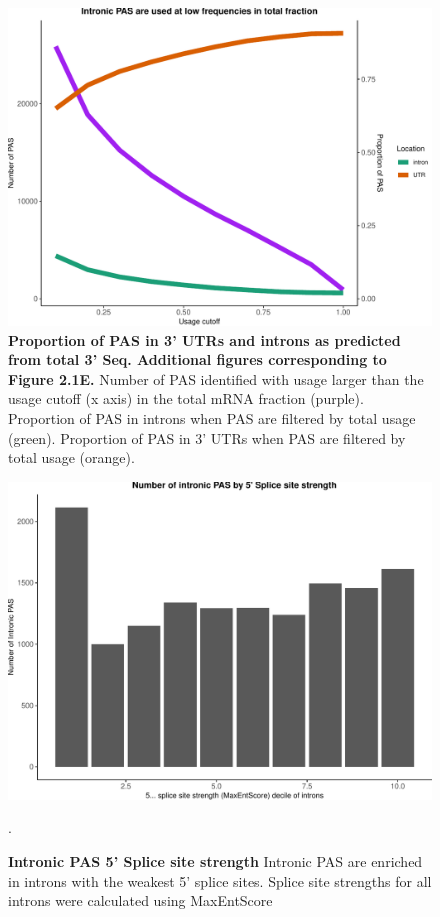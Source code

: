 \begin{figure}[!htb]
\centering
\includegraphics[width=5in]{img/ch02/Fig1_figuresupplement3.pdf}
\caption[Proportion of PAS in 3' UTRs and introns as predicted from total 3' Seq. Additional figures corresponding to Figure 2.1E.]{\textbf{Proportion of PAS in 3' UTRs and introns as predicted from total 3' Seq. Additional figures corresponding to Figure 2.1E.} Number of PAS identified with usage larger than the usage cutoff (x axis) in the total mRNA fraction (purple). Proportion of PAS in introns when PAS are filtered by total usage (green). Proportion of PAS in 3' UTRs when PAS are filtered by total usage (orange).}
\label{fig:totaUsage}
\end{figure}
\clearpage

\begin{figure}[!htb]
\centering \includegraphics[width=5in]{img/ch02/Fig1_figuresupplement4.pdf}
\caption[Intronic PAS 5' Splice site strength]{\textbf{Intronic PAS 5' Splice site strength} Intronic PAS are enriched in introns with the weakest 5' splice sites. Splice site strengths for all introns were calculated using MaxEntScore \citep{yeo_maximum_2004}}.
\label{fig:splicesite}
\end{figure}
\clearpage

